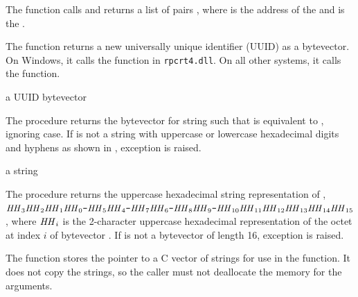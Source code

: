 The  function calls  and
returns a list of pairs , where
 is the address of the  and 
is the .

\begin{function}
\end{function}

The  function returns a new universally unique
identifier (UUID) as a bytevector. On Windows, it calls the
 function in \texttt{rpcrt4.dll}. On all other
systems, it calls the  function.

\begin{procedure}
\end{procedure}
\returns{} a UUID bytevector

The  procedure returns the bytevector 
for string  such that  is
equivalent to , ignoring case. If  is not a string with
uppercase or lowercase hexadecimal digits and hyphens as shown in
, exception 
is raised.

\begin{procedure}
\end{procedure}
\returns{} a string

The  procedure returns the uppercase hexadecimal
string representation of ,
$\var{HH}_3\var{HH}_2\var{HH}_1\var{HH}_0\code{-}\var{HH}_5\var{HH}_4\code{-}\var{HH}_7\var{HH}_6\code{-}\var{HH}_8\var{HH}_9\code{-}\var{HH}_{10}\var{HH}_{11}\var{HH}_{12}\var{HH}_{13}\var{HH}_{14}\var{HH}_{15}$,
where $\var{HH}_i$ is the 2-character uppercase hexadecimal
representation of the octet at index $i$ of bytevector .  If
 is not a bytevector of length 16, exception
 is raised.

\begin{function}
\end{function}

The  function stores the  pointer to a
C vector of  strings for use in the 
function. It does not copy the strings, so the caller must not
deallocate the memory for the arguments.

